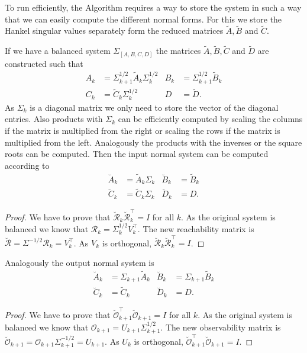 \documentclass[doctype=mastersthesis,BCOR=15mm,biblatex]{ldvbook}%
\newcommand{\R}{\mathcal{R}} %
\newcommand{\Ob}{\mathcal{O}} %
\newcommand{\eye}{I} %
\begin{document}
To run efficiently, the Algorithm requires a way to store the system in such a way that we can easily compute the different normal forms.
For this we store the Hankel singular values separately form the reduced matrices $\tilde{A},\tilde{B}$ and $\tilde{C}$.

If we have a balanced system $\Sigma_{[A,B,C,D]}$ the matrices $\tilde{A},\tilde{B},\tilde{C}$ and $\tilde{D}$ are constructed such that 
\begin{subequations}
\begin{align}
	A_k &= \Sigma_{k+1}^{1/2} \tilde{A}_k \Sigma_k^{1/2} &
	B_k &= \Sigma_{k+1}^{1/2} \tilde{B}_k \\
	C_k &= \tilde{C}_k \Sigma_k^{1/2} & 
	D&=\tilde{D}
	.
\end{align}\label{eq:stages_sigma}
\end{subequations}
As $\Sigma_k$ is a diagonal matrix we only need to store the vector of the diagonal entries.
Also products with $\Sigma_k$ can be efficiently computed by scaling the columns if the matrix is multiplied from the right or scaling the rows if the matrix is multiplied from the left.
Analogously the products with the inverses or the square roots can be computed.
Then the input normal system can be computed according to
\begin{subequations}
\begin{align}
\breve{A}_k &=  \tilde{A}_k \Sigma_k &
\breve{B}_k &=  \tilde{B}_k \\
\breve{C}_k &= \tilde{C}_k \Sigma_k & 
\breve{D}_k &= D
.
\end{align}
\end{subequations}
\begin{proof}
We have to prove that $\breve{\R}_k \breve{\R}_k^\top = \eye$ for all $k$.
As the original system is balanced we know that $\R_k = \Sigma_k^{1/2} V_k^\top$.
The new reachability matrix is $\breve{\R} = \Sigma^{-1/2} \R_{k} = V_k^\top$.
As $V_k$ is orthogonal, $\breve{\R}_k \breve{\R}_k^\top = \eye$.
\end{proof}
Analogously the output normal system is
\begin{subequations}
\begin{align}
\breve{A}_k &= \Sigma_{k+1} \tilde{A}_k  &
\breve{B}_k &= \Sigma_{k+1} \tilde{B}_k \\
\breve{C}_k &= \tilde{C}_k  & 
\breve{D}_k &=D
.
\end{align}
\end{subequations}
\begin{proof}
We have to prove that $\breve{\Ob}_{k+1}^\top \breve{\Ob}_{k+1} = \eye$ for all $k$.
As the original system is balanced we know that $\Ob_{k+1} = U_{k+1} \Sigma_{k+1}^{1/2}$.
The new observability matrix is $\breve{\Ob}_{k+1} = \Ob_{k+1} \Sigma_{k+1}^{-1/2} = U_{k+1}$.
As $U_k$ is orthogonal, $\breve{\Ob}_{k+1}^\top \breve{\Ob}_{k+1} = \eye$.
\end{proof}
\end{document}
